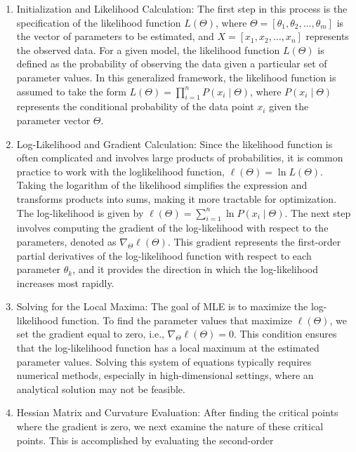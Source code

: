 \documentclass[
  12 pt,
  a4paper,
]{book}
\providecommand{\tightlist}{%
  \setlength{\itemsep}{0pt}\setlength{\parskip}{0pt}}
\numberwithin{equation}{section}
\theoremstyle{plain}      %
\theoremstyle{definition} %
\theoremstyle{remark}     %
\theoremstyle{note}         %
\begin{document}
\begin{enumerate}
\def\labelenumi{\arabic{enumi}.}
\tightlist
\item
  Initialization and Likelihood Calculation: The first step in this
  process is the specification of the likelihood function \(L(\Theta)\),
  where \(\Theta=\left[\theta_1, \theta_2, \ldots, \theta_m\right]\) is
  the vector of parameters to be estimated, and
  \(X=\left[x_1, x_2, \ldots, x_n\right]\) represents the observed data.
  For a given model, the likelihood function \(L(\Theta)\) is defined as
  the probability of observing the data given a particular set of
  parameter values. In this generalized framework, the likelihood
  function is assumed to take the form
  \(L(\Theta)=\prod_{i=1}^n P\left(x_i \mid \Theta\right)\), where
  \(P\left(x_i \mid \Theta\right)\) represents the conditional
  probability of the data point \(x_i\) given the parameter vector
  \(\Theta\).
\item
  Log-Likelihood and Gradient Calculation: Since the likelihood function
  is often complicated and involves large products of probabilities, it
  is common practice to work with the loglikelihood function,
  \(\ell(\Theta)=\ln L(\Theta)\). Taking the logarithm of the likelihood
  simplifies the expression and transforms products into sums, making it
  more tractable for optimization. The log-likelihood is given by
  \(\ell(\Theta)=\sum_{i=1}^n \ln P\left(x_i \mid \Theta\right)\). The
  next step involves computing the gradient of the log-likelihood with
  respect to the parameters, denoted as
  \(\nabla_{\Theta} \ell(\Theta)\). This gradient represents the
  first-order partial derivatives of the log-likelihood function with
  respect to each parameter \(\theta_k\), and it provides the direction
  in which the log-likelihood increases most rapidly.
\item
  Solving for the Local Maxima: The goal of MLE is to maximize the
  log-likelihood function. To find the parameter values that maximize
  \(\ell(\Theta)\), we set the gradient equal to zero, i.e.,
  \(\nabla_{\Theta} \ell(\Theta)=0\). This condition ensures that the
  log-likelihood function has a local maximum at the estimated parameter
  values. Solving this system of equations typically requires numerical
  methods, especially in high-dimensional settings, where an analytical
  solution may not be feasible.
\item
  Hessian Matrix and Curvature Evaluation: After finding the critical
  points where the gradient is zero, we next examine the nature of these
  critical points. This is accomplished by evaluating the second-order

\end{enumerate}
\end{document}
